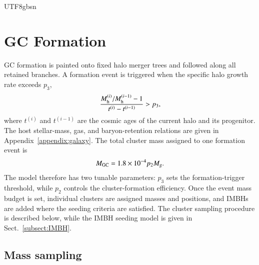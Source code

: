 \documentclass[trackchanges, twocolappendix, twocolumn]{aastex701}
\begin{document}
\begin{CJK*}{UTF8}{gbsn}
\section{GC Formation} \label{appx:GCform}

GC formation is painted onto fixed halo merger trees and followed along all retained branches. A formation event is triggered when the specific halo growth rate exceeds $p_3$,
\begin{align}
\dfrac{M_{\rm h}^{(i)} / M_{\rm h}^{(i - 1)} - 1}{t^{(i)} - t^{(i - 1)}} > p_3 ,
\label{eq:p3}
\end{align}
where $t^{(i)}$ and $t^{(i - 1)}$ are the cosmic ages of the current halo and its progenitor. The host stellar-mass, gas, and baryon-retention relations are given in Appendix~\ref{appendix:galaxy}. The total cluster mass assigned to one formation event is
\begin{align}
M_{\rm GC} = 1.8 \times 10^{-4} p_2 M_{\rm g} .
\label{eq:p2}
\end{align}
The model therefore has two tunable parameters: $p_3$ sets the formation-trigger threshold, while $p_2$ controls the cluster-formation efficiency. Once the event mass budget is set, individual clusters are assigned masses and positions, and IMBHs are added where the seeding criteria are satisfied. The cluster sampling procedure is described below, while the IMBH seeding model is given in Sect.~\ref{subsect:IMBH}.

\subsection{Mass sampling}
\label{subsect:mass_sample}


\end{CJK*}
\end{document}
